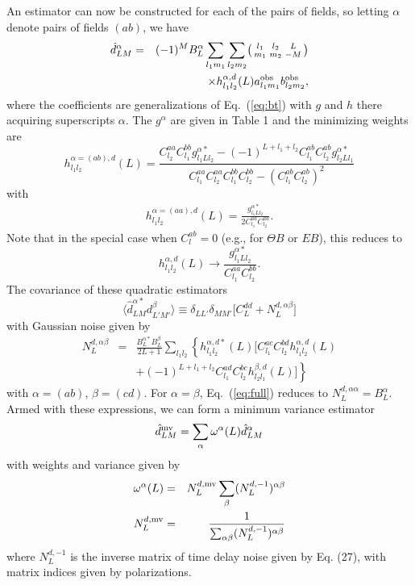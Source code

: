 \documentclass[prd,amsmath,amssymb,floatfix,superscriptaddress,nofootinbib,twocolumn]{revtex4-1}
\def\be{\begin{equation}}
\def\ee{\end{equation}}
\def\bea{\begin{eqnarray}}
\def\eea{\end{eqnarray}}
\newcommand{\ec}[1]{Eq.~(\ref{eq:#1})}
\newcommand{\eql}[1]{\label{eq:#1}}
\begin{document}
An estimator can now be constructed for each of the pairs of fields, so letting $\alpha$ denote pairs of fields $(ab)$, we have
\bea
\hat{d}^{\alpha}_{LM} &=&\nonumber  (-1)^{M} B_{L}^{\alpha}\sum_{l_{1}m_{1}}\sum_{l_{2}m_{2}}\bigl(\begin{smallmatrix} l_1 & l_2 & L \\ m_1 & m_2 & -M  \end{smallmatrix}\bigr) \\
&& \times h^{\alpha,d}_{l_{1}l_{2}}(L) a^{\rm obs}_{l_{1}m_{1}}b^{\rm obs}_{l_{2}m_{2}} ,
\eea
where the coefficients are generalizations of \ec{bt} with $g$ and $h$ there acquiring superscripts $\alpha$. The $g^\alpha$ are given in Table 1 and the minimizing weights are
\be
h^{\alpha=(ab),d}_{l_{1}l_{2}}(L) 
= \frac{C_{l_{2}}^{aa}C_{l_{1}}^{bb}g^{\alpha*}_{l_{1}Ll_{2}}-(-1)^{L+l_{1}+l_{2}}C_{l_{1}}^{ab}C_{l_{2}}^{ab}g^{\alpha*}_{l_{2}Ll_{1}}}{C_{l_{1}}^{aa}C_{l_{2}}^{aa}C_{l_{1}}^{bb}C_{l_{2}}^{bb}-(C_{l_{1}}^{ab}C_{l_{2}}^{ab})^{2}}
\ee
with 
\bea 
h_{l_{1}l_{2}}^{\alpha=(aa),d}(L)= \frac{g_{l_{1}Ll_{2}}^{\alpha*}}{2C_{l_{1}}^{aa}C_{l_{2}}^{aa}}.
\eea 
Note that in the special case when $C_{l}^{ab}=0$ (e.g., for $\Theta B$ or $EB$), this reduces to 
\be
h^{\alpha,d}_{l_{1}l_{2}}(L) \rightarrow \frac{g^{\alpha *}_{l_{1}Ll_{2}}}{C_{l_{1}}^{aa}C_{l_{2}}^{bb}}. 
\ee
The covariance of these quadratic estimators
\be
\langle \hat{d}^{\alpha*}_{LM}d^{\beta}_{L'M'}\rangle \equiv \delta_{LL'}\delta_{MM'}\big[ C_{L}^{dd}+N_{L}^{d,\alpha \beta} \big]
\ee
with Gaussian noise given by
\bea
N_{L}^{d,\alpha\beta}&=&\frac{B_{L}^{\alpha*}B_{L}^{\beta}}{2L+1}\sum_{l_{1}l_{2}}  \left\{ h_{l_{1}l_{2}}^{\alpha,d*} (L)\big[ C_{l_{1}}^{ac}C_{l_{2}}^{bd}h_{l_{1}l_{2}}^{\alpha,d}(L)\right. \nonumber \\
&&\left. +(-1)^{L+l_{1}+l_{2}}C_{l_{1}}^{ad}C_{l_{2}}^{bc} h_{l_{2}l_{1}}^{\beta,d}(L)  \big]\right\}\eql{full}
\eea
with $\alpha=(ab)$, $\beta=(cd)$. For $\alpha=\beta$, \ec{full} reduces to $N_{L}^{d,\alpha\alpha}=B_{L}^{\alpha}$.
Armed with these expressions, we can form a minimum variance estimator
\be
\hat{d}^{\rm mv}_{LM} = \sum_{\alpha}\omega^{\alpha}(L)\hat{d}^{\alpha}_{LM}
\ee
with weights and variance given by
\bea
\omega^{\alpha}(L) & =&N^{d,\rm mv}_{L} \sum_{\beta}(N_{L}^{d,-1})^{\alpha \beta} \\
N^{d,\rm mv}_{L} &=& \frac{1}{\sum_{\alpha\beta} (N_{L}^{d,-1})^{\alpha \beta}}
\eea
where $N_{L}^{d,-1}$ is the inverse matrix of time delay noise given by Eq. (27), with matrix indices given by polarizations. 
\end{document}
